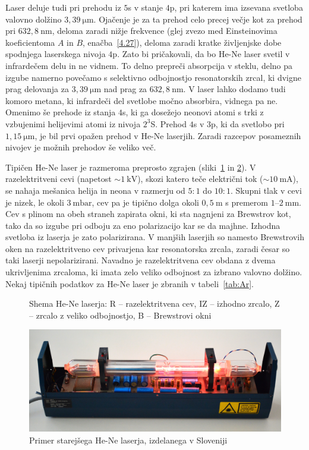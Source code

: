 Laser deluje tudi pri prehodu iz $5$s v stanje $4$p, pri katerem 
ima izsevana svetloba valovno dolžino $3,39~\si{\micro\metre}$. 
Ojačenje je za ta prehod celo precej večje kot za
prehod pri $632,8~\si{\nano\metre}$, deloma zaradi nižje frekvence 
(glej zvezo med Einsteinovima koeficientoma $A$ in $B$, enačba~\ref{4.27}), 
deloma zaradi kratke življenjske dobe spodnjega laserskega nivoja $4$p. 
Zato bi pričakovali, da bo He-Ne laser svetil v infrardečem delu in ne vidnem. 
To delno prepreči absorpcija v steklu, delno pa izgube namerno povečamo s selektivno odbojnostjo
resonatorskih zrcal, ki dvigne prag delovanja za $3,39~\si{\micro\metre}$ 
nad prag za $632,8~\si{\nano\metre}$. V laser lahko dodamo tudi
komoro metana, ki infrardeči del svetlobe močno absorbira, vidnega pa ne.
Omenimo še prehode iz stanja $4$s, ki ga dosežejo neonovi atomi s trki
z vzbujenimi helijevimi atomi iz nivoja $2^3$S. Prehod $4$s v $3$p, ki da svetlobo
pri $1,15~\si{\micro\metre}$, je bil prvi opažen prehod v He-Ne laserjih.
Zaradi razcepov posameznih nivojev je možnih prehodov še veliko več.

Tipičen He-Ne laser je razmeroma preprosto zgrajen (sliki~\ref{fig:HeNeShema}
in \ref{fig:Iskra}).
V razelektritveni cevi (napetost  $\sim 1~\si{\kilo\volt}$), skozi
katero teče električni tok ($\sim 10~\si{\milli\ampere}$), 
se nahaja mešanica helija in neona v razmerju od
$5:1$ do $10:1$. Skupni tlak v cevi je nizek, le okoli $3~\si{\milli\bar}$, 
cev pa je tipično dolga okoli $0,5~\si{\metre}$ s premerom $1$--$2~\si{\milli\metre}$.  
Cev s plinom na obeh straneh zapirata okni, ki sta nagnjeni za Brewstrov kot, 
tako da so izgube pri odboju za eno polarizacijo kar se da majhne.
Izhodna svetloba iz laserja je zato polarizirana. V manjših laserjih
so namesto Brewstrovih oken na razelektritveno cev privarjena kar
resonatorska zrcala, zaradi česar so taki laserji nepolarizirani. 
Navadno je razelektritvena cev obdana z dvema ukrivljenima zrcaloma, 
ki imata zelo veliko odbojnost za izbrano valovno dolžino.
Nekaj tipičnih podatkov za He-Ne laser je zbranih v tabeli~\ref{tab:Ar}.
\begin{figure}[ht]
\centering
\def\svgwidth{100truemm} 

\caption{Shema He-Ne laserja: R -- razelektritvena cev, IZ -- izhodno zrcalo, Z -- zrcalo
z veliko odbojnostjo, B -- Brewstrovi okni}
\label{fig:HeNeShema}
\end{figure}

\begin{figure}[ht]
\centering
\includegraphics[width=100truemm]{slike/07_HeNe.jpg}
\caption{Primer starejšega He-Ne laserja, izdelanega v Sloveniji}
\label{fig:Iskra}
\end{figure}

